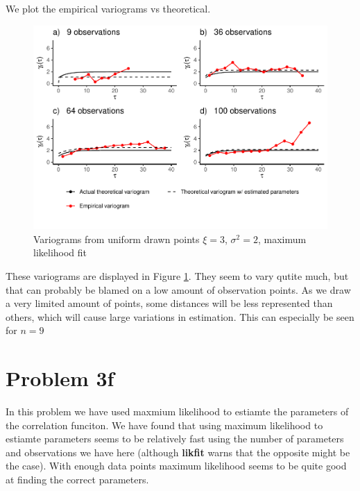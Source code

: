 \documentclass[]{article}
\begin{document}
We plot the empirical variograms vs theoretical.

\begin{figure}
\centering
\includegraphics{Exercise_1_files/figure-latex/unnamed-chunk-8-1.pdf}
\caption{\label{fig:fig3d2} Variograms from uniform drawn points
\(\xi = 3\), \(\sigma^2 = 2\), maximum likelihood fit}
\end{figure}

These variograms are displayed in Figure \ref{fig:fig3d2}. They seem to
vary qutite much, but that can probably be blamed on a low amount of
observation points. As we draw a very limited amount of points, some
distances will be less represented than others, which will cause large
variations in estimation. This can especially be seen for \(n=9\)

\section{Problem 3f}\label{problem-3f}

In this problem we have used maxmium likelihood to estiamte the
parameters of the correlation funciton. We have found that using maximum
likelihood to estiamte parameters seems to be relatively fast using the
number of parameters and observations we have here (although
\textbf{likfit} warns that the opposite might be the case). With enough
data points maximum likelihood seems to be quite good at finding the
correct parameters.
\end{document}
